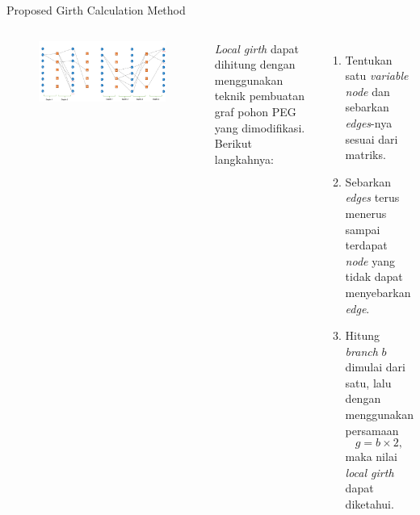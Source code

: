 \documentclass[11pt, aspectratio=169]{beamer}
\begin{document}
\begin{frame}{Proposed Girth Calculation Method}
	

	\begin{columns}
	\vspace{-2cm}
	\begin{figure}
		\centering 
		\includegraphics[scale=0.25]{gambarafa/hitunggirth}
		\centering 
	\end{figure}
		\textit{Local girth} dapat dihitung dengan menggunakan teknik pembuatan graf pohon PEG yang dimodifikasi. Berikut langkahnya:
		\begin{enumerate}
			\item Tentukan satu \textit{variable node} dan sebarkan \textit{edges}-nya sesuai dari matriks.
			\item Sebarkan \textit{edges} terus menerus sampai terdapat \textit{node} yang tidak dapat menyebarkan \textit{edge}.
			\item Hitung \textit{branch} $b$ dimulai dari satu, lalu dengan menggunakan persamaan
			\begin{equation}
			g=b\times 2,
			\end{equation}
			maka nilai \textit{local girth} dapat diketahui.
		\end{enumerate}
	\end{columns}
	
	
\end{frame}
\end{document}
